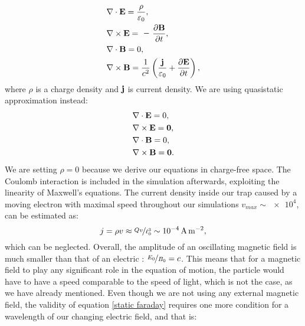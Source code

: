 \begin{description}
\begin{subequations}
\label{full maxwell}
\begin{align}
	\label{full gauss}
	&\nabla \cdot \vb{E} = \dfrac{\rho}{\varepsilon_0}, \\
	\label{full faraday}
	&\nabla \times \vb{E} = \minus\dfrac{\partial\vb{B}}{\partial t}, \\
	\label{full magnet}
	&\nabla \cdot \vb{B} = 0, \\
	\label{full ampere}
	&\nabla \times \vb{B} = \dfrac{1}{c^2} \left( \dfrac{\vb{j}}{\varepsilon_0} +  \dfrac{\partial\vb{E}}{\partial t} \right),
\end{align}
\end{subequations}
where $\rho$ is a charge density and $\vb{j}$ is current density. We are using quasistatic approximation instead:
\begin{subequations}
\label{static maxwell}
\begin{align}
	\label{static gauss}
	&\nabla \cdot \vb{E} = 0, \\
	\label{static faraday}
	&\nabla \times \vb{E} = \vb{0}, \\
	\label{static magnet}
	&\nabla \cdot \vb{B} = 0, \\
	\label{static ampere}
	&\nabla \times \vb{B} = \vb{0}.
\end{align}
\end{subequations}
We are setting $\rho=0$ because we derive our equations in charge-free space. The Coulomb interaction is included in the simulation afterwards, exploiting the linearity of Maxwell's equations. The current density inside our trap caused by a moving electron with maximal speed throughout our simulations $v_{max} \sim \num{e+4}$, can be estimated as:
\begin{equation}
	j = \rho v \approx \nicefrac{Q v}{\ell_0^3} \sim \SI{e-4}{A.m^{-2}},
\end{equation}
which can be neglected. Overall, the amplitude of an oscillating magnetic field is much smaller than that of an electric \cite{Friedman_1982}: $\nicefrac{E_0}{B_0} = c$. This means that for a magnetic field to play any significant role in the equation of motion, the particle would have to have a speed comparable to the speed of light, which is not the case, as we have already mentioned. Even though we are not using any external magnetic field, the validity of equation \eqref{static faraday} requires one more condition \cite{Friedman_1982} for a wavelength of our changing electric field, and that is:
\begin{equation}

\end{equation}
\end{description}

